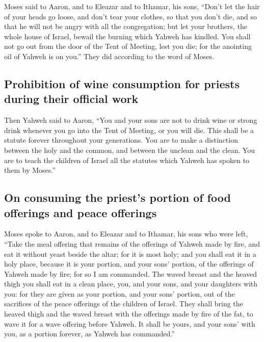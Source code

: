  Moses said to Aaron, and to Eleazar and to Ithamar, his
sons, ``Don't let the hair of your heads go loose, and don't tear your
clothes, so that you don't die, and so that he will not be angry with
all the congregation; but let your brothers, the whole house of Israel,
bewail the burning which Yahweh has kindled.  You shall
not go out from the door of the Tent of Meeting, lest you die; for the
anointing oil of Yahweh is on you.'' They did according to the word of
Moses.

\hypertarget{prohibition-of-wine-consumption-for-priests-during-their-official-work}{%
\subsection{Prohibition of wine consumption for priests during their
official
work}\label{prohibition-of-wine-consumption-for-priests-during-their-official-work}}

 Then Yahweh said to Aaron,  ``You and your
sons are not to drink wine or strong drink whenever you go into the Tent
of Meeting, or you will die. This shall be a statute forever throughout
your generations.  You are to make a distinction between
the holy and the common, and between the unclean and the clean.
 You are to teach the children of Israel all the statutes
which Yahweh has spoken to them by Moses.''

\hypertarget{on-consuming-the-priests-portion-of-food-offerings-and-peace-offerings}{%
\subsection{On consuming the priest's portion of food offerings and
peace
offerings}\label{on-consuming-the-priests-portion-of-food-offerings-and-peace-offerings}}

 Moses spoke to Aaron, and to Eleazar and to Ithamar, his
sons who were left, ``Take the meal offering that remains of the
offerings of Yahweh made by fire, and eat it without yeast beside the
altar; for it is most holy;  and you shall eat it in a
holy place, because it is your portion, and your sons' portion, of the
offerings of Yahweh made by fire; for so I am commanded. 
The waved breast and the heaved thigh you shall eat in a clean place,
you, and your sons, and your daughters with you: for they are given as
your portion, and your sons' portion, out of the sacrifices of the peace
offerings of the children of Israel.  They shall bring
the heaved thigh and the waved breast with the offerings made by fire of
the fat, to wave it for a wave offering before Yahweh. It shall be
yours, and your sons' with you, as a portion forever, as Yahweh has
commanded.''

